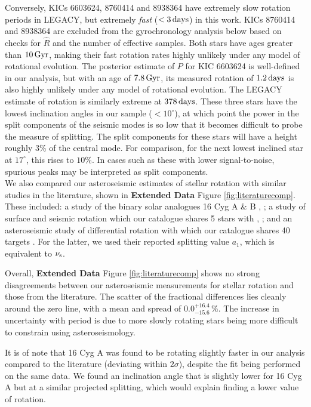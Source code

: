\documentclass[12pt]{article}
\begin{document}
Conversely, KICs 6603624, 8760414 and 8938364 have extremely slow rotation periods in LEGACY, but extremely \textit{fast} ($<3\, \rm {days}$) in this work. KICs 8760414 and 8938364 are excluded from the gyrochronology analysis below based on checks for $\hat{R}$ and the number of effective samples. Both stars have ages greater than $10\, \rm Gyr$, making their fast rotation rates highly unlikely under any model of rotational evolution. The posterior estimate of $P$ for KIC 6603624 is well-defined in our analysis, but with an age of $7.8\, \rm Gyr$, its measured rotation of $1.2\, \rm days$ is also highly unlikely under any model of rotational evolution. The LEGACY estimate of rotation is similarly extreme at $378\, \rm days$. These three stars have the lowest inclination angles in our sample ($< 10^\circ$), at which point the power in the split components of the seismic modes is so low that it becomes difficult to probe the measure of splitting. The split components for these stars will have a height roughly 3\% of the central mode. For comparison, for the next lowest inclined star at $17^\circ$, this rises to $10\%$. In cases such as these with lower signal-to-noise, spurious peaks may be interpreted as split components.\\

We also compared our asteroseismic estimates of stellar rotation with similar studies in the literature, shown in \textbf{Extended Data} Figure \ref{fig:literaturecomp}. These included: a study of the binary solar analogues 16 Cyg A \& B \cite{m_davies+2015}, ; a study of surface and seismic rotation which our catalogue shares 5 stars with \cite{m_nielsen+2015}, ; and an asteroseismic study of differential rotation with which our catalogue shares 40 targets \cite{m_benomar+2018}. For the latter, we used their reported splitting value $a_1$, which is equivalent to $\nu_{\rm s}$. 

Overall,  \textbf{Extended Data} Figure \ref{fig:literaturecomp} shows no strong disagreements between our asteroseismic measurements for stellar rotation and those from the literature. The scatter of the fractional differences lies cleanly around the zero line, with a mean and spread of $0.0_{-15.6}^{+16.4}\, \%$. The increase in uncertainty with period is due to more slowly rotating stars being more difficult to constrain using asteroseismology.

It is of note that 16 Cyg A was found to be rotating slightly faster in our analysis compared to the literature \cite{m_davies+2015} (deviating within $2\sigma$), despite the fit being performed on the same data. We found an inclination angle that is slightly lower for 16 Cyg A but at a similar projected splitting, which would explain finding a lower value of rotation.
\end{document}
